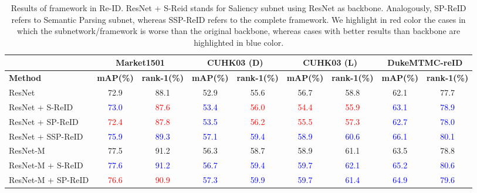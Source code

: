 \documentclass[final,3p,times,twocolumn]{elsarticle}
\begin{document}
\begin{table*}[!htb]
\renewcommand{\arraystretch}{1.1}
\setlength{\tabcolsep}{1.1mm}
\centering
\caption{Results of framework in Re-ID. ResNet + S-Reid stands for Saliency subnet using ResNet as backbone. Analogously, SP-ReID refers to Semantic Parsing subnet, whereas SSP-ReID refers to the complete framework. We highlight in red color the cases in which the subnetwork/framework is worse than the original backbone, whereas cases with better results than backbone are highlighted in blue color.}
\label{table:results-re-id}
\small
\begin{tabular}{lcccccccc}
\toprule
&\multicolumn{2}{c}{\textbf{Market1501}} &\multicolumn{2}{c}{\textbf{CUHK03 (D)}} &\multicolumn{2}{c}{\textbf{CUHK03 (L)}} & \multicolumn{2}{c}{\textbf{DukeMTMC-reID}} \\
\midrule
\textbf{Method} & \textbf{mAP(\%)} & \textbf{rank-1(\%)} & \textbf{mAP(\%)} & \textbf{rank-1(\%)} & \textbf{mAP(\%)} & \textbf{rank-1(\%)} & \textbf{mAP(\%)} & \textbf{rank-1(\%)} \\
\midrule
ResNet~\cite{he2016deep} & 72.9 & 88.1 & 52.9 & 55.6 & 56.7 & 58.8 & 62.1 & 77.7 \\
ResNet + S-ReID     & \textcolor{blue}{73.0} & \textcolor{red}{87.6} & \textcolor{blue}{53.4} & \textcolor{red}{56.0} & \textcolor{red}{54.4}    & \textcolor{red}{55.9} & \textcolor{blue}{63.1} & \textcolor{blue}{78.9} \\
ResNet + SP-ReID    & \textcolor{red}{72.4} & \textcolor{red}{87.8} & \textcolor{blue}{53.5} & \textcolor{red}{56.2} & \textcolor{red}{55.5}     & \textcolor{red}{57.3} & \textcolor{blue}{62.7} & \textcolor{blue}{78.0} \\
ResNet + SSP-ReID   & \textcolor{blue}{75.9} & \textcolor{blue}{89.3} & \textcolor{blue}{57.1} & \textcolor{blue}{59.4} & \textcolor{blue}{58.9} & \textcolor{blue}{60.6} & \textcolor{blue}{66.1} & \textcolor{blue}{80.1} \\
\midrule
ResNet-M~\cite{yu2017devil}         & 77.5 & 91.2 & 56.3 & 58.7 & 58.9 & 61.1 & 63.5 & 78.8 \\ 
ResNet-M + S-ReID   & \textcolor{blue}{77.6} & \textcolor{blue}{91.2} & \textcolor{blue}{56.7} & \textcolor{blue}{59.4} & \textcolor{blue}{59.7} & \textcolor{blue}{62.1} & \textcolor{blue}{65.2} & \textcolor{blue}{80.6} \\
ResNet-M + SP-ReID  & \textcolor{red}{76.6} & \textcolor{red}{90.9} & \textcolor{blue}{57.3} & \textcolor{blue}{59.9} & \textcolor{blue}{59.7}   & \textcolor{blue}{61.4} & \textcolor{blue}{64.9} & \textcolor{blue}{79.6} \\

\end{tabular}
\end{table*}
\end{document}
